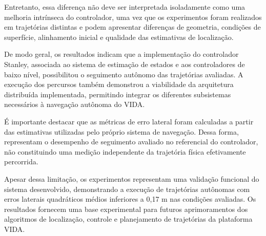 Entretanto, essa diferença não deve ser interpretada isoladamente como uma melhoria intrínseca do controlador, uma vez que os experimentos foram realizados em trajetórias distintas e podem apresentar diferenças de geometria, condições de superfície, alinhamento inicial e qualidade das estimativas de localização.

De modo geral, os resultados indicam que a implementação do controlador Stanley, associada ao sistema de estimação de estados e aos controladores de baixo nível, possibilitou o seguimento autônomo das trajetórias avaliadas. A execução dos percursos também demonstrou a viabilidade da arquitetura distribuída implementada, permitindo integrar os diferentes subsistemas necessários à navegação autônoma do VIDA.

É importante destacar que as métricas de erro lateral foram calculadas a partir das estimativas utilizadas pelo próprio sistema de navegação. Dessa forma, representam o desempenho de seguimento avaliado no referencial do controlador, não constituindo uma medição independente da trajetória física efetivamente percorrida.

Apesar dessa limitação, os experimentos representam uma validação funcional do sistema desenvolvido, demonstrando a execução de trajetórias autônomas com erros laterais quadráticos médios inferiores a 0,17 m nas condições avaliadas. Os resultados fornecem uma base experimental para futuros aprimoramentos dos algoritmos de localização, controle e planejamento de trajetórias da plataforma VIDA.

